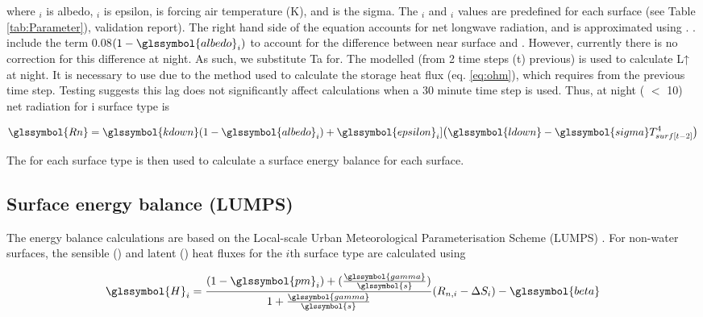 \documentclass[final,3p,times,authoryear]{elsarticle}
\begin{document}
where $_{i}$ is \glsdesc{albedo}, $_{i}$ is \glsdesc{epsilon},  is forcing air temperature (K), and  is the \glsdesc{sigma}. The $_{i}$ and $_{i}$ values are predefined for each surface (see Table \ref{tab:Parameter}), validation report).  The right hand side of the equation accounts for net longwave radiation, and  is approximated using . \cite{Loridan2011}. include the term 0.08$(1-\glssymbol{albedo}_{i})$ to account for the difference between near surface  and . However, currently there is no correction for this difference at night. As such, we substitute Ta for. The modelled  (from 2 time steps (t) previous) is used to calculate L↑ at night. It is necessary to use  due to the method used to calculate the storage heat flux (eq. \ref{eq:ohm}), which requires  from the previous time step.  Testing suggests this lag does not significantly affect calculations when a 30 minute time step is used. Thus, at night ( $<$ 10) net radiation for i surface type is

\begin{equation} 
\glssymbol{Rn}  
 = \glssymbol{kdown} 
 (1-\glssymbol{albedo}_{i}) + \glssymbol{epsilon}_{i}] \big(\glssymbol{ldown}-\glssymbol{sigma} T_{surf[t-2]}^{4} \big) 
\label{eq:rn2} \end{equation} 


The  for each surface type is then used to calculate a surface energy balance for each surface. 
\subsection{Surface energy balance (LUMPS)}\label{sec:lumps}

The energy balance calculations are based on the Local-scale Urban Meteorological Parameterisation Scheme (LUMPS) \citep{Grimmond2002a}. For non-water surfaces, the sensible () and latent () heat fluxes for the $i$th surface type are calculated using


\begin{equation} 
\glssymbol{H}_{i} = 
\frac{(1-\glssymbol{pm}_{i})+(\frac{\glssymbol{gamma}}{\glssymbol{s}})}{1+\frac{\glssymbol{gamma}}{\glssymbol{s}}}
(R_{n,i} -\Delta S_{i})- \glssymbol{beta}
\label{eq:Hi} \end{equation} 
\end{document}
